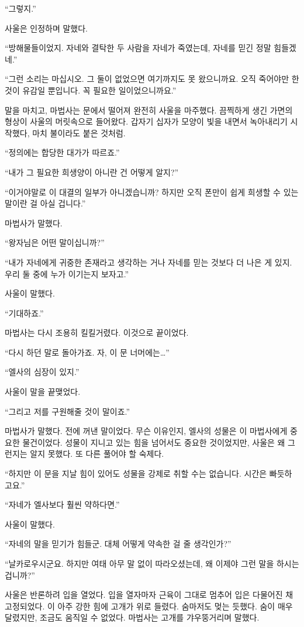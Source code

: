 ``그렇지.''

사울은 인정하며 말했다.

``방해물들이었지. 자네와 결탁한 두 사람을 자네가 죽였는데, 자네를 믿긴 정말 힘들겠네.''

``그런 소리는 마십시오. 그 둘이 없었으면 여기까지도 못 왔으니까요. 오직 죽어야만 한 것이 유감일 뿐입니다. 꼭 필요한 일이었으니까요.''

말을 마치고, 마법사는 문에서 떨어져 완전히 사울을 마주했다. 끔찍하게 생긴 가면의 형상이 사울의 머릿속으로 들어왔다. 갑자기 십자가 모양이 빛을 내면서 녹아내리기 시작했다, 마치 불이라도 붙은 것처럼.

``정의에는 합당한 대가가 따르죠.''

``내가 그 필요한 희생양이 아니란 건 어떻게 알지?''

``이거야말로 이 대결의 일부가 아니겠습니까? 하지만 오직 폰만이 쉽게 희생할 수 있는 말이란 걸 아실 겁니다.''

마법사가 말했다.

``왕자님은 어떤 말이십니까?''

``내가 자네에게 귀중한 존재라고 생각하는 거나 자네를 믿는 것보다 더 나은 게 있지. 우리 둘 중에 누가 이기는지 보자고.''

사울이 말했다.

``기대하죠.''

마법사는 다시 조용히 킬킬거렸다. 이것으로 끝이었다.

``다시 하던 말로 돌아가죠. 자, 이 문 너머에는\ldots''

``엘사의 심장이 있지.''

사울이 말을 끝맺었다.

``그리고 저를 구원해줄 것이 말이죠.''

마법사가 말했다. 전에 꺼낸 말이었다. 무슨 이유인지, 엘사의 성물은 이 마법사에게 중요한 물건이었다. 성물이 지니고 있는 힘을 넘어서도 중요한 것이었지만, 사울은 왜 그런지는 알지 못했다. 또 다른 풀어야 할 숙제다.

``하지만 이 문을 지날 힘이 있어도 성물을 강제로 취할 수는 없습니다. 시간은 빠듯하고요.''

``자네가 엘사보다 훨씬 약하다면.''

사울이 말했다.

``자네의 말을 믿기가 힘들군. 대체 어떻게 약속한 걸 줄 생각인가?''

``날카로우시군요. 하지만 여태 아무 말 없이 따라오셨는데, 왜 이제야 그런 말을 하시는 겁니까?''

사울은 반론하려 입을 열었다. 입을 열자마자 근육이 그대로 멈추어 입은 다물어진 채 고정되었다. 이 아주 강한 힘에 고개가 위로 들렸다. 숨마저도 멎는 듯했다. 숨이 매우 달렸지만, 조금도 움직일 수 없었다. 마법사는 고개를 갸우뚱거리며 말했다.

